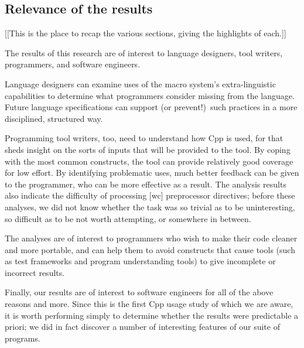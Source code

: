 \documentclass[10pt]{article}
\begin{document}
\subsection{Relevance of the results}

[[This is the place to recap the various sections, giving the highlights of
each.]]

The results of this research are of interest to language designers, tool
writers, programmers, and software engineers.

Language designers can examine uses of the macro system's extra-linguistic
capabilities to determine what programmers consider missing from the
language.  Future language specifications can support (or prevent!)\ such
practices in a more disciplined, structured way.


Programming tool writers, too, need to understand how Cpp is used, for that
sheds insight on the sorts of inputs that will be provided to the tool.  By
coping with the most common constructs, the tool can provide relatively
good coverage for low effort.  By identifying problematic uses, much better
feedback can be given to the programmer, who can be more effective as a
result.  The analysis results also indicate the difficulty of processing [wc]
preprocessor directives; before these analyses, we did not know whether the
task was so trivial as to be uninteresting, so difficult as to be not worth
attempting, or somewhere in between.

The analyses are of interest to programmers who wish to make their code
cleaner and more portable, and can help them to avoid constructs that cause
tools (such as test frameworks and program understanding tools)
to give incomplete or incorrect results.


Finally, our results are of interest to software engineers for all of the
above reasons and more.  Since this is the first Cpp usage study of which
we are aware, it is worth performing simply to determine whether the
results were predictable a priori; we did in fact discover a number of
interesting features of our suite of programs.
\end{document}
